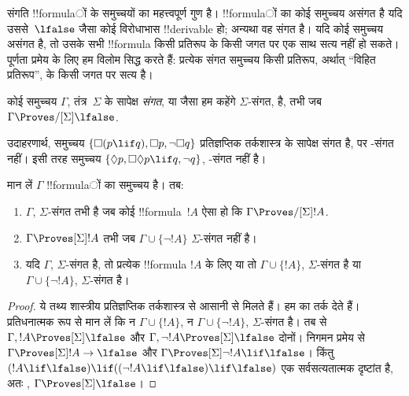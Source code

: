 \documentclass[../../../include/open-logic-section]{subfiles}
\begin{document}


संगति !!{formula}ों के समुच्चयों का महत्त्वपूर्ण गुण है। !!{formula}ों का कोई
समुच्चय असंगत है यदि उससे~$\lfalse$ जैसा कोई विरोधाभास !!{derivable} हो;
अन्यथा वह संगत है। यदि कोई समुच्चय असंगत है, तो उसके सभी !!{formula} किसी
प्रतिरूप के किसी जगत पर एक साथ सत्य नहीं हो सकते। पूर्णता प्रमेय के लिए हम
विलोम सिद्ध करते हैं: प्रत्येक संगत समुच्चय किसी प्रतिरूप, अर्थात्
``विहित प्रतिरूप'', के किसी जगत पर सत्य है।

\begin{defn}
  कोई समुच्चय $\Gamma$, तंत्र~$\Sigma$ के सापेक्ष \emph{संगत}, या जैसा हम
  कहेंगे $\Sigma$-संगत, है, तभी जब $\Gamma
  \Proves/[\Sigma] \lfalse$.
\end{defn}

उदाहरणार्थ, समुच्चय $\{\Box(p \lif q),\Box p,\lnot\Box q\}$ प्रतिज्ञप्तिक
तर्कशास्त्र के सापेक्ष संगत है, पर -संगत नहीं। इसी तरह समुच्चय
$\{\Diamond p, \Box\Diamond p \lif q, \lnot q\}$, -संगत नहीं है।

\begin{prop}
  मान लें $\Gamma$ !!{formula}ों का समुच्चय है। तब:
  \begin{enumerate}
  \item $\Gamma$, $\Sigma$-संगत तभी है जब कोई !!{formula}~$!A$ ऐसा हो कि
    $\Gamma \Proves/[\Sigma]
    !A$.
  \item {}%
    $\Gamma \Proves[\Sigma] !A$ तभी जब $\Gamma \cup \{\lnot!A\}$
    $\Sigma$-संगत नहीं है।
  \item {}%
    यदि $\Gamma$, $\Sigma$-संगत है, तो प्रत्येक !!{formula} $!A$ के लिए या
    तो $\Gamma \cup \{!A\}$, $\Sigma$-संगत है या
    $\Gamma \cup \{\lnot!A\}$, $\Sigma$-संगत है।
  \end{enumerate}
\end{prop}

\begin{proof}
  ये तथ्य शास्त्रीय प्रतिज्ञप्तिक तर्कशास्त्र से आसानी से मिलते हैं। हम
   का तर्क देते हैं। प्रतिधनात्मक रूप से मान
  लें कि न $\Gamma \cup \{!A\}$, न $\Gamma \cup \{\lnot!A\}$,
  $\Sigma$-संगत है। तब  से
  $\Gamma,!A \Proves[\Sigma]\lfalse$ और
  $\Gamma,\lnot!A \Proves[\Sigma]\lfalse$ दोनों। निगमन प्रमेय से
  $\Gamma \Proves[\Sigma] !A \to \lfalse$ और
  $\Gamma \Proves[\Sigma] \lnot!A \lif \lfalse$। किंतु
  $(!A \lif \lfalse) \lif ((\lnot!A \lif \lfalse) \lif \lfalse)$ एक
  सर्वसत्यतात्मक दृष्टांत है, अतः
  ,
  $\Gamma \Proves[\Sigma] \lfalse$।
\end{proof}
\end{document}

